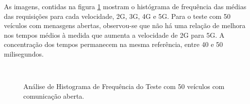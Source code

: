 \documentclass[
	12pt,				%
	oneside,			%
	a4paper,			%
	english,			%
	brazil				%
	]{abntex2ppgsi}
\begin{document}
As imagens, contidas na figura \ref{fig:imgHistFreq50} mostram o histógrama de frequência das médias das requisições para cada velocidade, 2G, 3G, 4G e 5G. Para o teste com 50 veículos com menasgens abertas, observou-se que não há uma relação de melhora nos tempos médios à medida que aumenta a velocidade de 2G para 5G.  A concentração dos tempos permanecem na mesma referência, entre 40 e 50 milisegundos.

\begin{figure}[h!]
	\caption{Análise de Histograma de Frequência do Teste  com 50 veículos com comunicação aberta.}
	\centering
	\label{fig:imgHistFreq50}
	\\
\end{figure}
\end{document}
